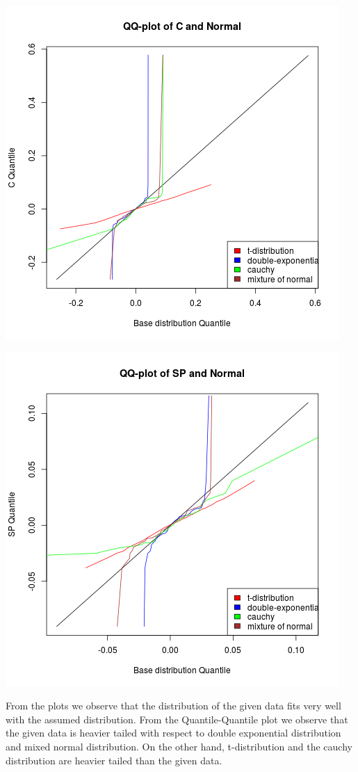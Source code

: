 \documentclass{article}
\begin{document}
\includegraphics{"plotc1"}
\pagebreak

\includegraphics{"plotc2"}
\pagebreak

From the plots we observe that the distribution of the given data fits very well with the assumed distribution. From the Quantile-Quantile plot we observe that the given data is heavier tailed with respect to double exponential distribution and mixed normal distribution. On the other hand, t-distribution and the cauchy distribution are heavier tailed than the given data.
\end{document}
